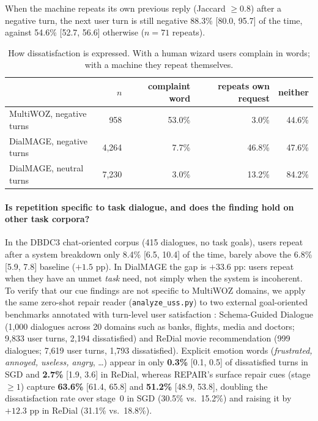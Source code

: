 \documentclass[11pt]{article}
\begin{document}
When the machine repeats its own previous reply (Jaccard $\ge 0.8$) after a negative turn, the
next user turn is still negative 88.3\% [80.0, 95.7] of the time, against 54.6\% [52.7, 56.6] otherwise
($n=71$ repeats).

\begin{table}[t]
\centering
\begin{tabular}{lrrrr}
\toprule
 & $n$ & complaint word & repeats own request & neither \\
\midrule
MultiWOZ, negative turns & 958 & 53.0\% & 3.0\% & 44.6\% \\
DialMAGE, negative turns & 4,264 & 7.7\% & 46.8\% & 47.6\% \\
DialMAGE, neutral turns & 7,230 & 3.0\% & 13.2\% & 84.2\% \\
\bottomrule
\end{tabular}
\caption{How dissatisfaction is expressed. With a human wizard users complain in words; with a machine
they repeat themselves.}
\label{tab:cues}
\end{table}

\paragraph{Is repetition specific to task dialogue, and does the finding hold on other task corpora?} In the
DBDC3 chat-oriented corpus \citep{higashinaka2016dbdc} (415 dialogues, no task goals), users repeat after a
system breakdown only 8.4\% [6.5, 10.4] of the time, barely above the 6.8\% [5.9, 7.8] baseline ($+1.5$ pp).
In DialMAGE the gap is $+33.6$ pp: users repeat when they have an unmet \emph{task} need, not simply when the
system is incoherent. To verify that our cue findings are not specific to MultiWOZ domains, we apply the same
zero-shot repair reader (\texttt{analyze\_uss.py}) to two external goal-oriented benchmarks annotated with
turn-level user satisfaction \citep{sun2021uss}: Schema-Guided Dialogue \citep[SGD;][]{rastogi2020sgd} (1,000
dialogues across 20 domains such as banks, flights, media and doctors; 9,833 user turns, 2,194 dissatisfied)
and ReDial movie recommendation (999 dialogues; 7,619 user turns, 1,793 dissatisfied). Explicit emotion words
(\emph{frustrated, annoyed, useless, angry}, \ldots) appear in only \textbf{0.3\%} [0.1, 0.5] of dissatisfied
turns in SGD and \textbf{2.7\%} [1.9, 3.6] in ReDial, whereas REPAIR's surface repair cues (stage $\ge 1$)
capture \textbf{63.6\%} [61.4, 65.8] and \textbf{51.2\%} [48.9, 53.8], doubling the dissatisfaction rate over
stage~0 in SGD (30.5\% vs.\ 15.2\%) and raising it by $+12.3$ pp in ReDial (31.1\% vs.\ 18.8\%).
\end{document}
